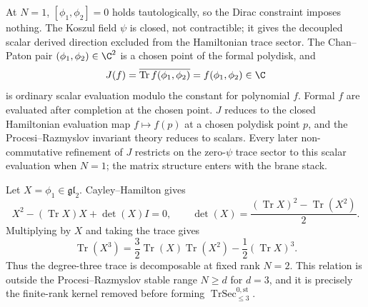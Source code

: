 \documentclass[11pt]{memoir}
\begin{document}
\begin{ex}[\(N=1\): the geometric prototype]\label{ex:N1-commuting-case}
  At \(N=1\), \([\phi_1,\phi_2]=0\) holds tautologically, so the Dirac
  constraint imposes nothing.  The Koszul field \(\psi\) is closed,
  not contractible; it gives the decoupled scalar derived direction
  excluded from the Hamiltonian trace sector.
  The Chan--Paton pair \((\phi_1,\phi_2)\in\C^2\) is a chosen point of
  the formal polydisk, and
  \[
    J(f)=\overline{\operatorname{Tr}f(\phi_1,\phi_2)}=f(\phi_1,\phi_2)
    \in\C
  \]
  is ordinary scalar evaluation modulo the constant for polynomial \(f\).
  Formal \(f\) are evaluated after completion at the chosen point.  \(J\)
  reduces
  to the closed Hamiltonian evaluation map \(f\mapsto f(p)\) at a chosen
  polydisk point \(p\), and the Procesi--Razmyslov invariant theory
  reduces to scalars.
  Every later non-commutative refinement of \(J\) restricts on the
  zero-\(\psi\) trace sector to this scalar evaluation when \(N=1\);
  the matrix structure enters with the brane stack.
\end{ex}

\begin{ex}[\(N=2\): first trace identity outside the stable range]\label{ex:N2-trace-identity-outside-range}
  Let \(X=\phi_1\in\mathfrak{gl}_2\).  Cayley--Hamilton gives
  \[
    X^2-(\operatorname{Tr}X)X+\det(X)I=0,
    \qquad
    \det(X)=\frac{(\operatorname{Tr}X)^2-\operatorname{Tr}(X^2)}{2}.
  \]
  Multiplying by \(X\) and taking the trace gives
  \[
    \operatorname{Tr}(X^3)
    =
    \frac{3}{2}\operatorname{Tr}(X)\operatorname{Tr}(X^2)
    -\frac{1}{2}(\operatorname{Tr}X)^3 .
  \]
  Thus the degree-three trace is decomposable at fixed rank \(N=2\).
  This relation is outside the Procesi--Razmyslov stable range
  \(N\geq d\) for \(d=3\), and it is precisely the finite-rank kernel
  removed before forming
  \(\operatorname{TrSec}^{0,\mathrm{st}}_{\le3}\).
\end{ex}
\end{document}
